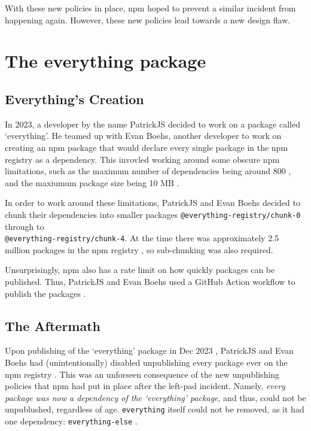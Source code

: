 \documentclass[acmsmall]{acmart}
\begin{document}
With these new policies in place, npm hoped to prevent a similar incident from happening again.
However, these new policies lead towards a new design flaw.

\section{The everything package}
\subsection{Everything's Creation}
In 2023, a developer by the name PatrickJS decided to work on a package called `everything'.
He teamed up with Evan Boehs, another developer to work on creating an npm package that
would declare every single package in the npm registry as a dependency. This invovled
working around some obscure npm limitations, such as the maximum number of dependencies
being around 800 \cite{youtube-everything}, and the maxiumum package size being 10 MB \cite{youtube-everything}.

In order to work around these limitations, PatrickJS and Evan Boehs decided to chunk their
dependencies into smaller packages \lstinline|@everything-registry/chunk-0| through to \\
\lstinline|@everything-registry/chunk-4|. At the time there was approximately 2.5 million
packages in the npm registry \cite{youtube-everything}, so sub-chunking was also required.

Unsurprisingly, npm also has a rate limit on how quickly packages can be published. Thus,
PatrickJS and Evan Boehs used a GitHub Action workflow to publish the packages \cite{youtube-everything}.

\subsection{The Aftermath}
Upon publishing of the `everything' package in Dec 2023 \cite{npm-everything},
PatrickJS and Evan Boehs had (unintentionally) disabled unpublishing every package ever on
the npm registry \cite{youtube-everything}. This was an unforseen consequence of the new
unpublishing policies that npm had put in place after the left-pad incident. Namely,
\textit{every package was now a dependency of the `everything' package},
and thus, could not be unpublushed, regardless of age. \lstinline|everything| itself could
not be removed, as it had one dependency: \lstinline|everything-else| \cite{npm-everything-else}.
\end{document}
